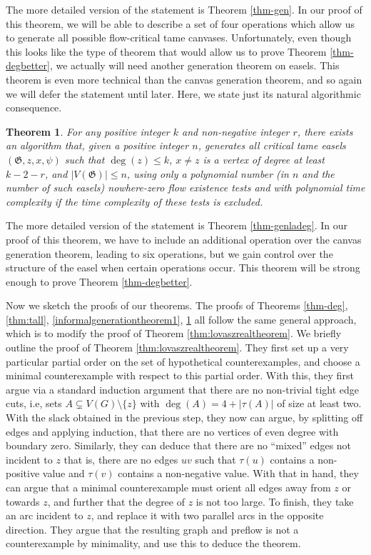 \documentclass{article}
\newcommand\g{\mathfrak{G}}
\newtheorem{theorem}{Theorem}[section]
\begin{document}
The more detailed version of the statement is Theorem \ref{thm-gen}. In our
proof of this theorem, we will be able to describe a set of four operations
which allow us to generate all possible flow-critical tame canvases.
Unfortunately, even though this looks like the type of theorem that would allow
us to prove Theorem \ref{thm-degbetter}, we actually will need another
generation theorem on easels. This theorem is even more technical than the
canvas generation theorem, and so again we will defer the statement until
later.  Here, we state just its natural algorithmic consequence.

\begin{theorem}
\label{informalgenerationtheorem2}
For any positive integer $k$ and non-negative integer $r$, there exists an algorithm that,
given a positive integer $n$, generates all critical tame easels $(\g,z,x,\psi)$ such that $\deg(z) \leq k$, $x \neq z$
is a vertex of degree at least $k -2 -r$, and $|V(\g)|\le n$,
using only a polynomial number (in $n$ and the number of such easels) nowhere-zero flow existence tests
and with polynomial time complexity if the time complexity of these tests is excluded.
\end{theorem}

The more detailed version of the statement is Theorem \ref{thm-genladeg}. In
our proof of this theorem, we have to include an additional operation over the
canvas generation theorem, leading to six operations, but we gain control over
the structure of the easel when certain operations occur. This theorem will be
strong enough to prove Theorem \ref{thm-degbetter}.

Now we sketch the proofs of our theorems. The proofs of Theorems \ref{thm-deg},
\ref{thm:tall}, \ref{informalgenerationtheorem1},
\ref{informalgenerationtheorem2} all follow the same general approach, which is
to modify the proof of Theorem \ref{thm:lovaszrealtheorem}. We briefly outline
the proof of Theorem \ref{thm:lovaszrealtheorem}. They first set up a very
particular partial order on the set of hypothetical counterexamples, and choose
a minimal counterexample with respect to this partial order. With this, they
first argue via a standard induction argument that there are no non-trivial tight
edge cuts, i.e, sets $A \subsetneq V(G) \setminus \{z\}$ with $\deg(A)=4 + |\tau(A)|$
of size at least two.  With the slack obtained in
the previous step, they now can argue, by splitting off edges and applying
induction, that there are no vertices of even degree with boundary zero. Similarly,
they can deduce that there are no ``mixed'' edges not incident to $z$\textemdash
that is, there are no edges $uv$ such that $\tau(u)$ contains a non-positive
value and $\tau(v)$ contains a non-negative value. With that in hand, they can
argue that a minimal counterexample must orient all edges away from $z$ or
towards $z$, and further that the degree of $z$ is not too large. To finish, they
take an arc incident to $z$, and replace it with two parallel arcs in the
opposite direction. They argue that the resulting graph and preflow is not a
counterexample by minimality, and use this to deduce the theorem.
\end{document}
